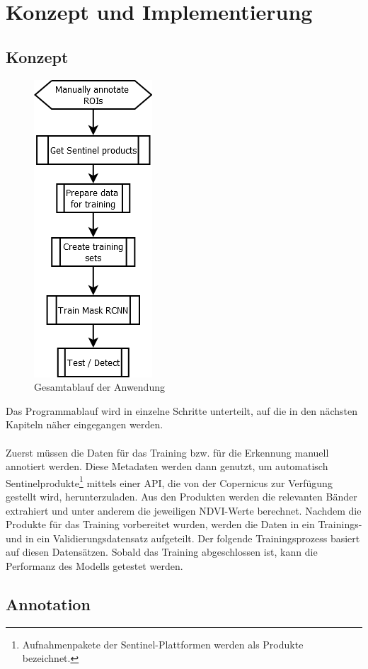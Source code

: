 \chapter{Konzept und Implementierung}\label{chap:concept}

\section{Konzept}\label{sec:concept}

\begin{figure}[ht]
  \centering
  \includegraphics[width=.2\textwidth]{pics/overview.PNG}
  \caption{Gesamtablauf der Anwendung}
  \label{fig:overview}
\end{figure}
\noindent
Das Programmablauf wird in einzelne Schritte unterteilt, auf die in den nächsten Kapiteln näher eingegangen werden.
\\\\
Zuerst müssen die Daten für das Training bzw. für die Erkennung manuell annotiert werden. Diese Metadaten werden dann genutzt, um automatisch Sentinelprodukte\footnote{Aufnahmenpakete der Sentinel-Plattformen werden als Produkte bezeichnet.} mittels einer API, die von der Copernicus zur Verfügung gestellt wird, herunterzuladen. Aus den Produkten werden die relevanten Bänder extrahiert und unter anderem die jeweiligen NDVI-Werte berechnet. Nachdem die Produkte für das Training vorbereitet wurden, werden die Daten in ein Trainings- und in ein Validierungsdatensatz aufgeteilt. Der folgende Trainingsprozess basiert auf diesen Datensätzen. Sobald das Training abgeschlossen ist, kann die Performanz des Modells getestet werden. 

\section{Annotation}\label{sec:annotation}

